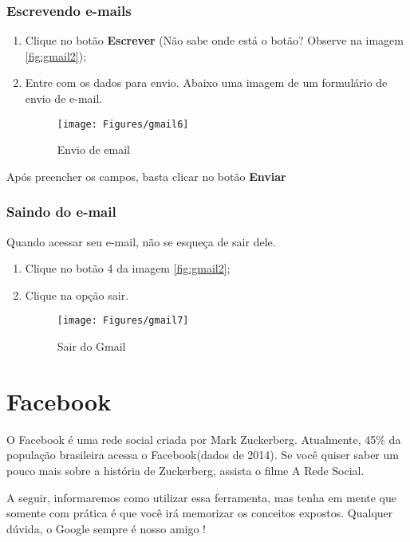 \documentclass[hidelinks,12pt]{article}
\begin{document}
	\subsubsection{Escrevendo e-mails}

	\begin{enumerate}
		\item Clique no botão \textbf{Escrever} (Não sabe onde está o botão? Observe na imagem \ref{fig:gmail2});
		\item Entre com os dados para envio. Abaixo uma imagem de um formulário de envio de e-mail.

		\begin{figure}[!h]
			\centering
			\texttt{[image: Figures/gmail6]}
			\label{fig:gmail6}
			\caption{Envio de email}
		\end{figure}

	\end{enumerate}
	Após preencher os campos, basta clicar no botão \textbf{Enviar}
\newpage
	\subsubsection{Saindo do e-mail}

	Quando acessar seu e-mail, não se esqueça de sair dele.

	\begin{enumerate}
		\item Clique no botão 4 da imagem \ref{fig:gmail2};

		\item Clique na opção sair.

		\begin{figure}[!h]
			\centering
			\texttt{[image: Figures/gmail7]}
			\label{fig:gmail7}
			\caption{Sair do Gmail}
		\end{figure}

	\end{enumerate}

\newpage
	
\section{Facebook}

O Facebook é uma rede social criada por Mark Zuckerberg. Atualmente, 45\% da população brasileira acessa o Facebook(dados de 2014). Se você quiser saber um pouco mais sobre a história de Zuckerberg, assista o filme A Rede Social.

A seguir, informaremos como utilizar essa ferramenta, mas tenha em mente que somente com prática é que você irá memorizar os conceitos expostos. Qualquer dúvida, o Google sempre é nosso amigo !
\end{document}
